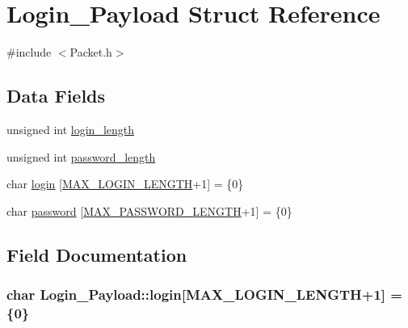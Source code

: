 \hypertarget{structLogin__Payload}{}\section{Login\+\_\+\+Payload Struct Reference}
\label{structLogin__Payload}


{\ttfamily \#include $<$Packet.\+h$>$}

\subsection*{Data Fields}
\begin{DoxyCompactItemize}
\item 
unsigned int \hyperlink{structLogin__Payload_ae20d686a1176b58a1409a551dbbe539b}{login\+\_\+length}
\item 
unsigned int \hyperlink{structLogin__Payload_a376b903185f3e8bb7dc0bd5bd55ebff9}{password\+\_\+length}
\item 
char \hyperlink{structLogin__Payload_ab824929845f4f1c9efb55f5757062da2}{login} \mbox{[}\hyperlink{Packet_8h_ab9445e27830d28f1e288bd223ab95296}{M\+A\+X\+\_\+\+L\+O\+G\+I\+N\+\_\+\+L\+E\+N\+G\+TH}+1\mbox{]} = \{0\}
\item 
char \hyperlink{structLogin__Payload_aadc289041604b574892f1cdb966c7ca5}{password} \mbox{[}\hyperlink{Packet_8h_a7f264fafe78080f8ea68715854b9bc24}{M\+A\+X\+\_\+\+P\+A\+S\+S\+W\+O\+R\+D\+\_\+\+L\+E\+N\+G\+TH}+1\mbox{]} = \{0\}
\end{DoxyCompactItemize}


\subsection{Field Documentation}
\subsubsection[{\texorpdfstring{login}{login}}]{\setlength{\rightskip}{0pt plus 5cm}char Login\+\_\+\+Payload\+::login\mbox{[}{\bf M\+A\+X\+\_\+\+L\+O\+G\+I\+N\+\_\+\+L\+E\+N\+G\+TH}+1\mbox{]} = \{0\}}\hypertarget{structLogin__Payload_ab824929845f4f1c9efb55f5757062da2}{}\label{structLogin__Payload_ab824929845f4f1c9efb55f5757062da2}
